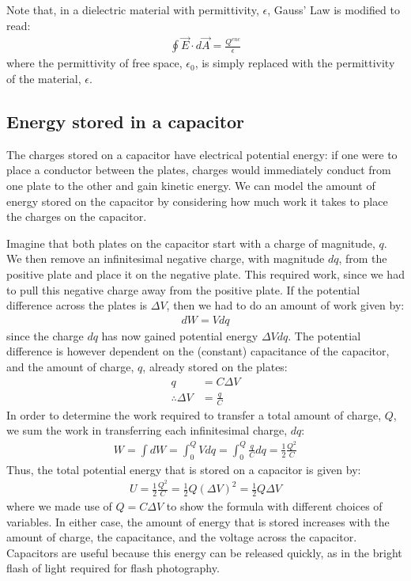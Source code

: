 
Note that, in a dielectric material with permittivity, $\epsilon$, Gauss' Law is modified to read:
\begin{align*}
\oint \vec E\cdot d\vec A=\frac{Q^{enc}}{\epsilon}
\end{align*}
where the permittivity of free space, $\epsilon_0$, is simply replaced with the permittivity of the material, $\epsilon$.

\subsection{Energy stored in a capacitor}
The charges stored on a capacitor have electrical potential energy: if one were to place a conductor between the plates, charges would immediately conduct from one plate to the other and gain kinetic energy. We can model the amount of energy stored on the capacitor by considering how much work it takes to place the charges on the capacitor.

Imagine that both plates on the capacitor start with a charge of magnitude, $q$. We then remove an infinitesimal negative charge, with magnitude $dq$, from the positive plate and place it on the negative plate. This required work, since we had to pull this negative charge away from the positive plate. If the potential difference across the plates is $\Delta V$, then we had to do an amount of work given by:
\begin{align*}
dW = Vdq
\end{align*}
since the charge $dq$ has now gained potential energy $\Delta Vdq$. The potential difference is however dependent on the (constant) capacitance of the capacitor, and the amount of charge, $q$, already stored on the plates:
\begin{align*}
q &= C\Delta V\\
\therefore \Delta V&=\frac{q}{C}
\end{align*}
In order to determine the work required to transfer a total amount of charge, $Q$, we sum the work in transferring each infinitesimal charge, $dq$:
\begin{align*}
W=\int dW=\int_0^Q Vdq=\int_0^Q \frac{q}{C}dq=\frac{1}{2}\frac{Q^2}{C}
\end{align*}
Thus, the total potential energy that is stored on a capacitor is given by:
\begin{align*}
U = \frac{1}{2}\frac{Q^2}{C} = \frac{1}{2}Q(\Delta V)^2=\frac{1}{2}Q\Delta V
\end{align*}
where we made use of $Q=C\Delta V$ to show the formula with different choices of variables. In either case, the amount of energy that is stored increases with the amount of charge, the capacitance, and the voltage across the capacitor. Capacitors are useful because this energy can be released quickly, as in the bright flash of light required for flash photography.

